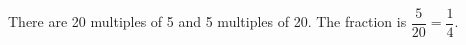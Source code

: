 There are 20 multiples of 5 and 5 multiples of 20. The fraction is $\dfrac{5}{20}=\boxed{\dfrac{1}{4}}$.
